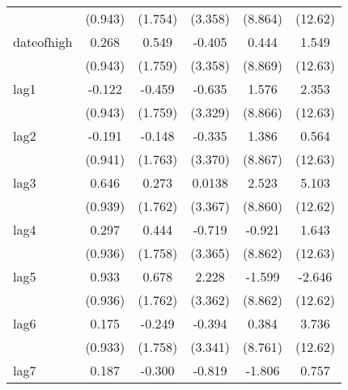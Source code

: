 {\begin{tabular}{l*{5}{c}}
            &     (0.943)         &     (1.754)         &     (3.358)         &     (8.864)         &     (12.62)         \\
[1em]
dateofhigh  &       0.268         &       0.549         &      -0.405         &       0.444         &       1.549         \\
            &     (0.943)         &     (1.759)         &     (3.358)         &     (8.869)         &     (12.63)         \\
[1em]
lag1        &      -0.122         &      -0.459         &      -0.635         &       1.576         &       2.353         \\
            &     (0.943)         &     (1.759)         &     (3.329)         &     (8.866)         &     (12.63)         \\
[1em]
lag2        &      -0.191         &      -0.148         &      -0.335         &       1.386         &       0.564         \\
            &     (0.941)         &     (1.763)         &     (3.370)         &     (8.867)         &     (12.63)         \\
[1em]
lag3        &       0.646         &       0.273         &      0.0138         &       2.523         &       5.103         \\
            &     (0.939)         &     (1.762)         &     (3.367)         &     (8.860)         &     (12.62)         \\
[1em]
lag4        &       0.297         &       0.444         &      -0.719         &      -0.921         &       1.643         \\
            &     (0.936)         &     (1.758)         &     (3.365)         &     (8.862)         &     (12.63)         \\
[1em]
lag5        &       0.933         &       0.678         &       2.228         &      -1.599         &      -2.646         \\
            &     (0.936)         &     (1.762)         &     (3.362)         &     (8.862)         &     (12.62)         \\
[1em]
lag6        &       0.175         &      -0.249         &      -0.394         &       0.384         &       3.736         \\
            &     (0.933)         &     (1.758)         &     (3.341)         &     (8.761)         &     (12.62)         \\
[1em]
lag7        &       0.187         &      -0.300         &      -0.819         &      -1.806         &       0.757         \\

\end{tabular}}

